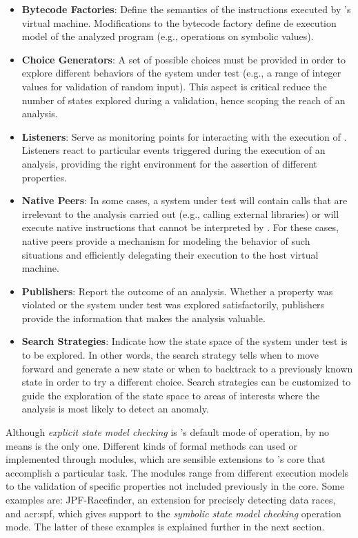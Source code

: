 \begin{itemize}
	\item \textbf{Bytecode Factories}: Define the semantics of the instructions executed by \jpf's virtual machine. Modifications to the bytecode factory define de execution model of the analyzed program (e.g., operations on symbolic values).
	
	\item \textbf{Choice Generators}: A set of possible choices must be provided in order to explore different behaviors of the system under test (e.g., a range of integer values for validation of random input). This aspect is critical reduce the number of states explored during a validation, hence scoping the reach of an analysis.
	
	\item \textbf{Listeners}: Serve as monitoring points for interacting with the execution of \jpf. Listeners react to particular events triggered during the execution of an analysis, providing the right environment for the assertion of different properties.
	
	\item \textbf{Native Peers}: In some cases, a system under test will contain calls that are irrelevant to the analysis carried out (e.g., calling external libraries) or will execute native instructions that cannot be interpreted by \jpf. For these cases, native peers provide a mechanism for modeling the behavior of such situations and efficiently delegating their execution to the host virtual machine.
	
	\item \textbf{Publishers}: Report the outcome of an analysis. Whether a property was violated or the system under test was explored satisfactorily, publishers provide the information that makes the analysis valuable.   
	
	\item \textbf{Search Strategies}: Indicate how the state space of the system under test is to be explored. In other words, the search strategy tells \jpf when to move forward and generate a new state or when to backtrack to a previously known state in order to try a different choice. Search strategies can be customized to guide the exploration of the state space to areas of interests where the analysis is most likely to detect an anomaly. 
\end{itemize}

Although \textit{explicit state model checking} is \jpf's default mode of operation, by no means is the only one. Different kinds of formal methods can used or implemented through modules, which are sensible extensions to \jpf's core that accomplish a particular task. The modules range from different execution models to the validation of specific properties not included previously in the core. Some examples are: JPF-Racefinder, an extension for precisely detecting data races, and \acrfull{acr:spf}, which gives support to the \textit{symbolic state model checking} operation mode. The latter of these examples is explained further in the next section.

